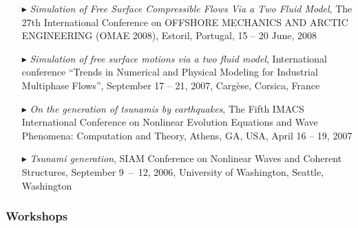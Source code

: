 \begin{itemize}
  \item[$\blacktriangleright$] \textit{Simulation of Free Surface Compressible Flows Via a Two Fluid Model}, The 27th International Conference on OFFSHORE MECHANICS AND ARCTIC ENGINEERING (OMAE 2008), Estoril, Portugal, 15 -- 20 June, 2008
  
  \item[$\blacktriangleright$] \textit{Simulation of free surface motions via a two fluid model}, International conference ``Trends in Numerical and Physical Modeling for Industrial Multiphase Flows'', September 17 -- 21, 2007, Carg\`ese, Corsica, France
  
  \item[$\blacktriangleright$] \textit{On the generation of tsunamis by earthquakes}, The Fifth IMACS International Conference on Nonlinear Evolution Equations and Wave Phenomena: Computation and Theory, Athens, GA, USA, April 16 -- 19, 2007
  
  \item[$\blacktriangleright$] \textit{Tsunami generation}, SIAM Conference on Nonlinear Waves and Coherent Structures, September 9~--~12, 2006, University of Washington, Seattle, Washington
  
\end{itemize}

\separator
\subsubsection{Workshops}

